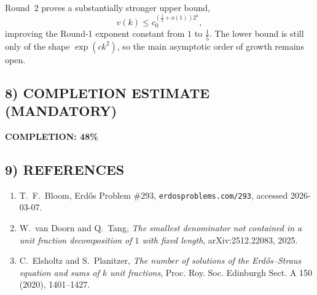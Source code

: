 Round~2 proves a substantially stronger upper bound,
\[
v(k)\le c_0^{(\frac15+o(1))2^k},
\]
improving the Round-1 exponent constant from $1$ to $\frac15$. The lower bound is still only of the shape $\exp(ck^2)$, so the main asymptotic order of growth remains open.

\subsection*{8) COMPLETION ESTIMATE (MANDATORY)}

\textbf{COMPLETION: 48\%}

\subsection*{9) REFERENCES}

\begin{enumerate}
\item T.~F.~Bloom, Erd\H{o}s Problem \#293, \texttt{erdosproblems.com/293}, accessed 2026-03-07.
\item W.~van Doorn and Q.~Tang, \emph{The smallest denominator not contained in a unit fraction decomposition of $1$ with fixed length}, arXiv:2512.22083, 2025.
\item C.~Elsholtz and S.~Planitzer, \emph{The number of solutions of the Erd\H{o}s--Straus equation and sums of $k$ unit fractions}, Proc. Roy. Soc. Edinburgh Sect. A 150 (2020), 1401--1427.
\end{enumerate}

